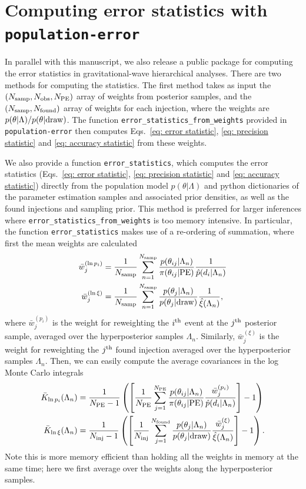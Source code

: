 \section{Computing error statistics with \texttt{population-error}}
\label{app: computing the statistics}

In parallel with this manuscript, we also release a public package for computing the error statistics in gravitational-wave hierarchical analyses. There are two methods for computing the statistics. The first method takes as input the $(N_{\rm samp}, N_{\rm obs}, N_{\rm PE})$ array of weights from posterior samples, and the $(N_{\rm samp}, N_{\rm found})$ array of weights for each injection, where the weights are $p(\theta |\Lambda) / p(\theta|{\rm draw})$. The function \texttt{error\_statistics\_from\_weights} provided in \texttt{population-error} then computes Eqs.~\ref{eq: error statistic}, \ref{eq: precision statistic} and \ref{eq: accuracy statistic} from these weights. 

We also provide a function \texttt{error\_statistics}, which computes the error statistics (Eqs.~\ref{eq: error statistic}, \ref{eq: precision statistic} and \ref{eq: accuracy statistic}) directly from the population model $p(\theta | \Lambda)$ and python dictionaries of the parameter estimation samples and associated prior densities, as well as the found injections and sampling prior. This method is preferred for larger inferences where \texttt{error\_statistics\_from\_weights} is too memory intensive. In particular, the function \texttt{error\_statistics} makes use of a re-ordering of summation, where first the mean weights are calculated
\begin{align}
    \bar{w}^{(\ln p_i)}_{j} &= \frac{1}{N_{\rm samp}}\sum_{n=1}^{N_{\rm samp}} \frac{p(\theta_{ij}|\Lambda_n)}{\pi(\theta_{ij}|{\rm PE})}\frac{1}{\hat{p}(d_i|\Lambda_n)} \\
    \bar{w}^{(\ln \xi)}_{j} &= \frac{1}{N_{\rm samp}}\sum_{n=1}^{N_{\rm samp}} \frac{p(\theta_{j}|\Lambda_n)}{p(\theta_{j}|{\rm draw})}\frac{1}{\hat{\xi}(\Lambda_n)},
\end{align}
where $\bar{w}^{(p_i)}_{j}$ is the weight for reweighting the $i^{\rm th}$ event at the $j^{\rm th}$ posterior sample, averaged over the hyperposterior samples $\Lambda_n$. Similarly, $\bar{w}^{(\xi)}_{j}$ is the weight for reweighting the $j^{\rm th}$ found injection averaged over the hyperposterior samples $\Lambda_n$. Then, we can easily compute the average covariances in the log Monte Carlo integrals
\begin{align}
    \bar{K}_{\ln p_i}(\Lambda_n) &= \frac{1}{N_{\rm PE} - 1}\left(\left[\frac{1}{N_{\rm PE}}\sum_{j=1}^{N_{\rm PE}}\frac{p(\theta_{ij}|\Lambda_n)}{\pi(\theta_{ij}|{\rm PE})}\frac{\bar{w}^{(p_i)}_j}{\hat{p}(d_i|\Lambda_n)}\right] - 1\right) \\
    \bar{K}_{\ln \xi}(\Lambda_n) &= \frac{1}{N_{\rm inj} - 1}\left(\left[\frac{1}{N_{\rm inj}}\sum_{j=1}^{N_{\rm found}}\frac{p(\theta_{j}|\Lambda_n)}{p(\theta_{j}|{\rm draw})}\frac{\bar{w}^{(\xi)}_j}{\hat{\xi}(\Lambda_n)}\right] - 1\right).
\end{align}
Note this is more memory efficient than holding all the weights in memory at the same time; here we first average over the weights along the hyperposterior samples.

